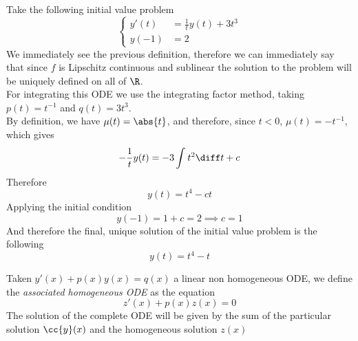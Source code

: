 \documentclass[../mmf.tex]{subfiles}
\begin{document}
\begin{eg}
	Take the following initial value problem
	\begin{equation*}
		\left\{\begin{aligned}
			y'(t)&=\frac{1}{t}y(t)+3t^3\\
			y(-1)&=2
		\end{aligned}\right.
	\end{equation*}
	We immediately see the previous definition, therefore we can immediately say that since $f$ is Lipschitz continuous and sublinear the solution to the problem will be uniquely defined on all of $\R$.\\
	For integrating this ODE we use the integrating factor method, taking $p(t)=t^{-1}$ and $q(t)=3t^3$.\\
	By definition, we have $\mu(t)=\abs{t}$, and therefore, since $t<0$, $\mu(t)=-t^{-1}$, which gives
	\begin{equation*}
		-\frac{1}{t}y(t)=-3\int_{}^{}t^2\diff t+c
	\end{equation*}
	Therefore
	\begin{equation*}
		y(t)=t^4-ct
	\end{equation*}
	Applying the initial condition
	\begin{equation*}
		y(-1)=1+c=2\implies{} c=1
	\end{equation*}
	And therefore the final, unique solution of the initial value problem is the following
	\begin{equation*}
		y(t)=t^4-t
	\end{equation*}
\end{eg}
\begin{thm}
	Taken $y'(x)+p(x)y(x)=q(x)$ a linear non homogeneous ODE, we define the \textit{associated homogeneous ODE} as the equation
	\begin{equation*}
		z'(x)+p(x)z(x)=0
	\end{equation*}
	The solution of the complete ODE will be given by the sum of the particular solution $\cc{y}(x)$ and the homogeneous solution $z(x)$
\end{thm}
\end{document}
